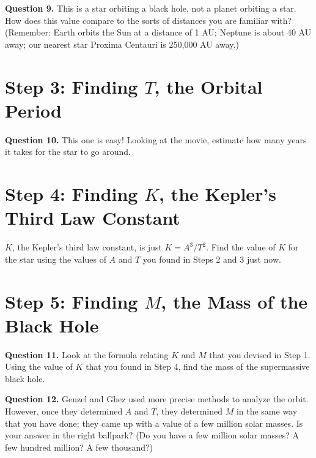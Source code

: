 \documentclass[11pt]{article}
\begin{document}
\vspace{.7in}

{\bf Question 9.} This is a star orbiting a black hole, not a planet orbiting a star. How does this value compare to the sorts of distances you are familiar with? (Remember: Earth orbits the Sun at a distance of 1 AU; Neptune is about 40 AU away; our nearest star Proxima Centauri is 250,000 AU away.)

\newpage
\section{Step 3: Finding $T$, the Orbital Period}

{\bf Question 10.} This one is easy! Looking at the movie, estimate how many years it takes for the star to go around.

\vspace{0.7in}

\section{Step 4: Finding $K$, the Kepler's Third Law Constant}

$K$, the Kepler’s third law constant, is just $K = A^3 / T^2$. Find the value of $K$ for the star using the values of $A$ and $T$ you found in Steps 2 and 3 just now.

\vspace{1in}


\section{Step 5: Finding $M$, the Mass of the Black Hole}

{\bf Question 11.} Look at the formula relating $K$ and $M$ that you devised in Step 1. Using the value of $K$ that you found in Step 4, find the mass of the supermassive black hole.

\vspace{1in}


{\bf Question 12.} Genzel and Ghez used more precise methods to analyze the orbit. However, once they determined $A$ and $T$, they determined $M$ in the same way that you have done; they came up with a value of a few million solar masses. Is your answer in the right ballpark? (Do you have a few million solar masses? A few hundred million? A few thousand?)

\vspace{1in}\newpage
\end{document}
